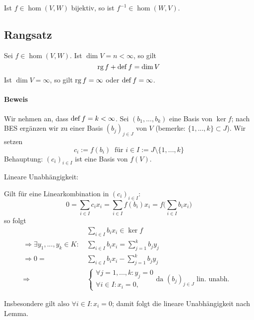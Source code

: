  		Ist $ f\in \hom (V,W) $ bijektiv, so ist $ f^{-1}\in \hom (W,V) $.

 \subsection{Rangsatz}
 	\begin{Satz}[Rangsatz]
 		Sei $ f\in \hom (V,W) $. Ist $ \dim V = n < \infty $,  so gilt
 		\[
 			\operatorname{rg} f + \operatorname{def} f = \dim V
 		\]
 		Ist $ \dim V = \infty $, so gilt $ \operatorname{rg} f = \infty $ oder $ \operatorname{def} f = \infty $.
 	\end{Satz}

 	\paragraph{Beweis}
 		Wir nehmen an, dass $ \operatorname{def} f = k < \infty $.
 		Sei $ (b_1,...,b_k) $ eine Basis von $ \ker f $;
 		nach BES ergänzen wir zu einer Basis $ (b_j)_{j\in J} $ von $ V $ (bemerke: $ \{1,...,k\}\subset J $).
 		Wir setzen
 		\[
 			c_i:=f(b_i)\ \text{ für } i\in I:=J\setminus \{1,...,k\}
 		\]
 		Behauptung: $(c_i)_{i\in I}$ ist eine Basis von $f(V)$.

 		Lineare Unabhängigkeit:
 		\begin{addmargin}[25pt]{0pt}
 			Gilt für eine Linearkombination in $(c_i)_{i\in I}$:
 			\[
 				0=\sum_{i\in I}c_ix_i = \sum_{i\in I}f(b_i)x_i = f\Big(\sum_{i\in I}b_ix_i\Big)
 			\]
 			so folgt
 			\begin{align*}
 				                                       & \sum_{i\in I}b_ix_i \in \ker f             \\
 				\Rightarrow \exists y_1,...,y_k\in K:\ &\sum_{i\in I}b_ix_i=\sum_{j=1}^{k}b_jy_j &                                            \\
 				\Rightarrow 0 =                        & \sum_{i\in I}b_ix_i - \sum_{j=1}^{k}b_jy_j \\
 				\Rightarrow                            &
 				\begin{cases}
 				\forall j = 1, ... ,k:y_j=0\\
 				\forall i\in I: x_i = 0,
 				\end{cases}
 				\text{da $(b_j)_{j\in J}$ lin. unabh.}
 			\end{align*}

 			Insbesondere gilt also $\forall i\in I: x_i = 0$; damit folgt die lineare Unabhängigkeit nach Lemma.
 		\end{addmargin}

